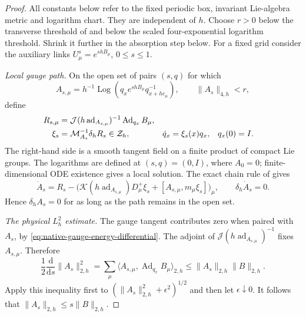 \documentclass[11pt]{article}
\numberwithin{equation}{section}
\theoremstyle{definition}
\theoremstyle{remark}
\newcommand{\dd}{\mathrm d}
\newcommand{\norm}[1]{\lVert#1\rVert}
\begin{document}
\begin{proof}
All constants below refer to the fixed periodic box, invariant Lie-algebra
metric and logarithm chart. They are independent of $h$. Choose $r>0$ below
the transverse threshold of  and below the scaled
four-exponential logarithm threshold. Shrink it further in the absorption
step below. For a fixed grid consider the auxiliary links
$U^s_\mu=e^{shB_\mu}$, $0\le s\le1$.

\emph{Local gauge path.}
On the open set of pairs $(s,q)$ for which
\[
 A_{s,\mu}=h^{-1}\operatorname{Log}
       (q_xe^{shB_\mu}q_{x+h e_\mu}^{-1}),\qquad\norm{A_s}_{4,h}<r,
\]
define
\begin{align}
 R_{s,\mu}
  &=\mathcal J(h\operatorname{ad}_{A_{s,\mu}})^{-1}
            \operatorname{Ad}_{q_x}B_\mu,\notag\\
 \xi_s&=\mathcal M_{A_s}^{-1}\delta_hR_s\in\mathcal Z_h,
 &\dot q_x&=\xi_s(x)q_x,
 &q_x(0)&=I.
 \label{eq:native-Coulomb-homotopy-ODE}
\end{align}
The right-hand side is a smooth tangent field on a finite product of compact
Lie groups. The logarithms are defined at $(s,q)=(0,I)$, where $A_0=0$;
finite-dimensional ODE existence gives a local solution. The exact chain
rule of  gives
\[
 \dot A_s=R_s-
   \bigl(\mathcal K(h\operatorname{ad}_{A_{s,\mu}})D_\mu^+\xi_s
                +[A_{s,\mu},m_\mu\xi_s]\bigr)_\mu,
 \qquad\delta_h\dot A_s=0.
\]
Hence $\delta_hA_s=0$ for as long as the path remains in the open set.

\emph{The physical $L_h^2$ estimate.}
The gauge tangent contributes zero when paired with $A_s$, by
\eqref{eq:native-gauge-energy-differential}. The adjoint of
$\mathcal J(h\operatorname{ad}_{A_{s,\mu}})^{-1}$ fixes $A_{s,\mu}$.
Therefore
\[
 \frac12\frac{\dd}{\dd s}\norm{A_s}_{2,h}^2
 =\sum_\mu\langle A_{s,\mu},\operatorname{Ad}_{q_x}B_\mu\rangle_{2,h}
 \le\norm{A_s}_{2,h}\norm B_{2,h}.
\]
Apply this inequality first to
$(\norm{A_s}_{2,h}^2+\epsilon^2)^{1/2}$ and then let
$\epsilon\downarrow0$. It follows that
$\norm{A_s}_{2,h}\le s\norm B_{2,h}$.


\end{proof}
\end{document}
